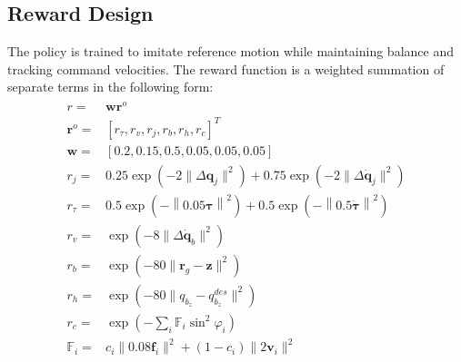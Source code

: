 \documentclass[letterpaper, 10 pt, journal, twoside]{IEEEtran} %
\begin{document}
\subsection{Reward Design}
The policy is trained to imitate reference motion while maintaining balance and tracking command velocities. The reward function is a weighted summation of separate terms in the following form:
\begin{eqnarray}
	\begin{aligned}
		r=&\boldsymbol{w}\boldsymbol{r}^o\\
		\boldsymbol{r}^o=&\left[r_\tau,r_v,r_j,r_b,r_h,r_c\right]^T \\
		\boldsymbol{w}=&\left[0.2,0.15,0.5,0.05,0.05,0.05\right] \\
		r_{j}=&0.25\exp{\left(-2\lVert\Delta \boldsymbol{q}_j\rVert^2\right)}
		+ 0.75\exp{\left(-2\lVert\Delta \dot{\boldsymbol{q}}_j\rVert^2\right)} \\
		r_{\tau}=&0.5\exp{\left(-\left\lVert0.05\boldsymbol{\tau}\right\rVert^2\right)}
		+0.5\exp{\left(-\left\lVert0.5\dot{\boldsymbol{\tau}}\right\rVert^2\right)}\\
		r_{v}=&\exp{\left(-8\lVert\Delta \dot{\boldsymbol{q}}_b\rVert^2\right)} \\
		r_{b}=&\exp{\left(-80\lVert \boldsymbol{r}_{g}-\boldsymbol{z}\rVert^2\right)} \\
		r_{h}=&\exp{\left(-80\lVert q_{b_z}-q_{b_z}^{des}\rVert^2\right)} \\
		r_{c}=&\exp{\left(-\sum_{i}{\mathbb{F}_i\sin^2{\varphi_i}}\right)} \\
		\mathbb{F}_i=&c_i\lVert 0.08\boldsymbol{f}_i\rVert^2+(1-c_i)\lVert2\boldsymbol{v}_i\rVert^2
	\end{aligned}
\end{eqnarray}
\end{document}
